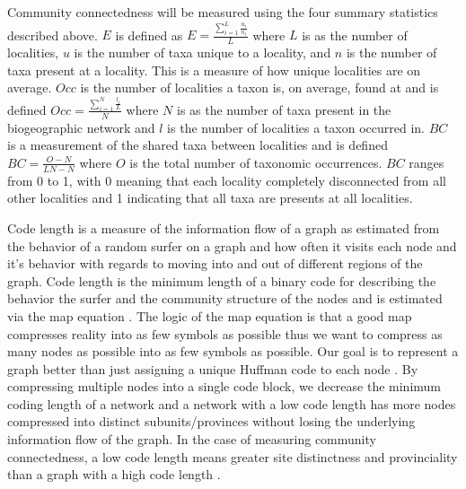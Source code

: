\documentclass[12pt,letterpaper]{article}
\begin{document}
Community connectedness will be measured using the four summary statistics described above. \(E\) is defined as 
\(
E = \frac{\sum_{i = 1}^{L} \frac{u_{i}}{n_{i}}}{L}
\)
where \(L\) is as the number of localities, \(u\) is the number of taxa unique to a locality, and \(n\) is the number of taxa present at a locality. This is a measure of how unique localities are on average. \(Occ\) is the number of localities a taxon is, on average, found at and is defined
\(
Occ = \frac{\sum_{i = 1}^{N} \frac{l_{i}}{L}}{N}
\)
where \(N\) is as the number of taxa present in the biogeographic network and \(l\) is the number of localities a taxon occurred in. \(BC\) is a measurement of the shared taxa between localities and is defined 
\(
BC = \frac{O - N}{LN - N}
\)
where \(O\) is the total number of taxonomic occurrences. \(BC\) ranges from 0 to 1, with 0 meaning that each locality completely disconnected from all other localities and 1 indicating that all taxa are presents at all localities. 

Code length is a measure of the information flow \citep{Shannon1948} of a graph as estimated from the behavior of a random surfer \citep{Brin1998} on a graph and how often it visits each node and it's behavior with regards to moving into and out of different regions of the graph. Code length is the minimum length of a binary code for describing the behavior the surfer and the community structure of the nodes and is estimated via the map equation \citep{Rosvall2008,Rosvall2009a}. The logic of the map equation is that a good map compresses reality into as few symbols as possible thus we want to compress as many nodes as possible into as few symbols as possible. Our goal is to represent a graph better than just assigning a unique Huffman code to each node \citep{Huffman1952,Rosvall2008}. By compressing multiple nodes into a single code block, we decrease the minimum coding length of a network and a network with a low code length has more nodes compressed into distinct subunits/provinces without losing the underlying information flow of the graph. In the case of measuring community connectedness, a low code length means greater site distinctness and provinciality than a graph with a high code length \citep{Sidor2013}. 
\end{document}
